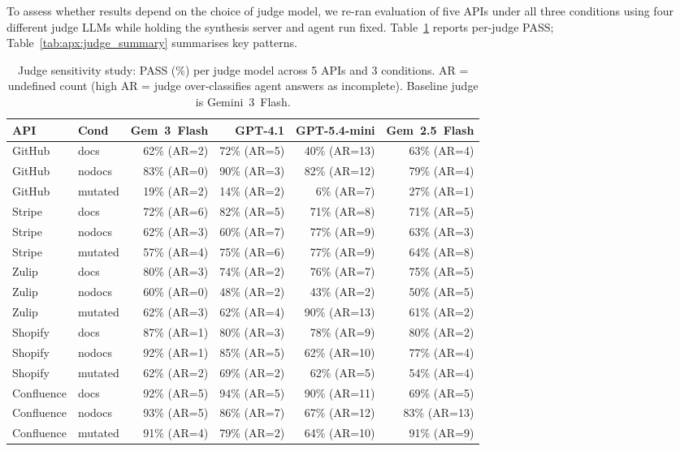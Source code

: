 To assess whether results depend on the choice of judge model, we re-ran evaluation of five APIs under all three conditions using four different judge LLMs while holding the synthesis server and agent run fixed. Table~\ref{tab:apx:judge} reports per-judge PASS; Table~\ref{tab:apx:judge_summary} summarises key patterns.

\begin{table}[htbp]
  \centering
  \caption{Judge sensitivity study: PASS (\%) per judge model across 5 APIs and 3 conditions.
    AR =  undefined count (high AR = judge over-classifies agent answers as incomplete).
    Baseline judge is Gemini~3~Flash.}
  \label{tab:apx:judge}
  \small
  \setlength{\tabcolsep}{4pt}
  \begin{tabular}{llrrrr}
    \toprule
    \textbf{API} & \textbf{Cond} & \textbf{Gem~3~Flash} & \textbf{GPT-4.1} & \textbf{GPT-5.4-mini} & \textbf{Gem~2.5~Flash} \\
    \midrule
    GitHub & docs    & 62\% (AR=2) & 72\% (AR=5) & 40\% (AR=13) & 63\% (AR=4) \\
    GitHub & nodocs  & 83\% (AR=0) & 90\% (AR=3) & 82\% (AR=12) & 79\% (AR=4) \\
    GitHub & mutated & 19\% (AR=2) & 14\% (AR=2) &  6\% (AR=7)  & 27\% (AR=1) \\
    \midrule
    Stripe & docs    & 72\% (AR=6) & 82\% (AR=5) & 71\% (AR=8)  & 71\% (AR=5) \\
    Stripe & nodocs  & 62\% (AR=3) & 60\% (AR=7) & 77\% (AR=9)  & 63\% (AR=3) \\
    Stripe & mutated & 57\% (AR=4) & 75\% (AR=6) & 77\% (AR=9)  & 64\% (AR=8) \\
    \midrule
    Zulip  & docs    & 80\% (AR=3) & 74\% (AR=2) & 76\% (AR=7)  & 75\% (AR=5) \\
    Zulip  & nodocs & 60\% (AR=0) & 48\% (AR=2) & 43\% (AR=2) & 50\% (AR=5) \\
    Zulip  & mutated & 62\% (AR=3) & 62\% (AR=4) & 90\% (AR=13) & 61\% (AR=2) \\
    \midrule
    Shopify & docs   & 87\% (AR=1) & 80\% (AR=3) & 78\% (AR=9)  & 80\% (AR=2) \\
    Shopify & nodocs & 92\% (AR=1) & 85\% (AR=5) & 62\% (AR=10) & 77\% (AR=4) \\
    Shopify & mutated& 62\% (AR=2) & 69\% (AR=2) & 62\% (AR=5)  & 54\% (AR=4) \\
    \midrule
    Confluence & docs    & 92\% (AR=5) & 94\% (AR=5) & 90\% (AR=11) & 69\% (AR=5) \\
    Confluence & nodocs  & 93\% (AR=5) & 86\% (AR=7) & 67\% (AR=12) & 83\% (AR=13) \\
    Confluence & mutated & 91\% (AR=4) & 79\% (AR=2) & 64\% (AR=10) & 91\% (AR=9) \\
    \bottomrule
  \end{tabular}
  \par\smallskip

\end{table}

